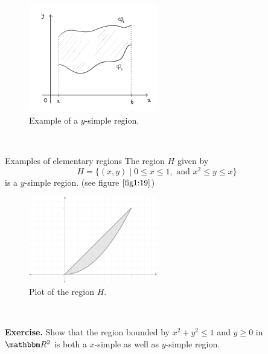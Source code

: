 \documentclass[../Analysis-3.tex]{subfiles}
\begin{document}
\begin{figure}[H]
    \centering
    \includegraphics[width=0.5\textwidth]{../figures/ysimpleRegion.png}
    \caption{Example of a $y$-simple region.}
\end{figure}

\

\begin{Eg}{Examples of elementary regions}{}
    The region $H$ given by
    \[
        H = \{ (x,y) \mid 0 \leq x \leq 1, \mbox{ and } x^2 \leq y \leq x \}
    \]
    is a $y$-simple region. (see figure $\ref{fig1:19}$)
    \begin{figure}[H]
        \centering
        \includegraphics[width=0.5\textwidth]{../figures/simpleRegion.png}
        \caption{Plot of the region $H$.}
        \label{fig1:19}
    \end{figure}
\end{Eg}
\

\textbf{Exercise.} Show that the region bounded by $x^2 + y^2 \leq 1$ and $y \geq 0$ in $\R^2$ is both a $x$-simple as well as $y$-simple region.
\end{document}
